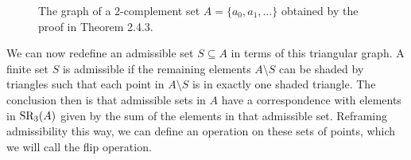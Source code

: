 \documentclass{article}
\theoremstyle{definition}
\newcommand{\SR}{\textnormal{SR}}
\newcommand{\OrigTop}[4]{
    \tkzDefShiftPoint[#1](120:#2){\fpeval{#1 * 2 + 3}}
    \tkzDefShiftPoint[#1](60:#2){\fpeval{#1 * 2 + 4}}
    \IfEqCase{#3}{
    {fill}{
    \tkzDrawPolygon[fill = gray!20](#1,\fpeval{#1 * 2 + 3},\fpeval{#1 * 2 + 4})
    }
    {nofill}{\tkzDrawPolygon(#1,\fpeval{#1 * 2 + 3},\fpeval{#1 * 2 + 4})}
    }
    \tkzDrawPoints(\fpeval{#1 * 2 + 3},\fpeval{#1 * 2 + 4})
    \IfEqCase{#4}{
    {end}{
    \tkzLabelPoint[above left](\fpeval{#1 * 2 + 3}){$\ddots$}
    \tkzLabelPoint[above right](\fpeval{#1 * 2 + 4}){$\iddots$}
    }
    {mid}{}
    }
}
\newcommand{\OrigRight}[4]{
    \tkzDefShiftPoint[#1](0:#2){\fpeval{#1 * 2 + 3}}
    \tkzDefShiftPoint[#1](-60:#2){\fpeval{#1 * 2 + 4}}
    \IfEqCase{#3}{
    {fill}{
    \tkzDrawPolygon[fill = gray!20](#1,\fpeval{#1 * 2 + 3},\fpeval{#1 * 2 + 4})
    }
    {nofill}{\tkzDrawPolygon(#1,\fpeval{#1 * 2 + 3},\fpeval{#1 * 2 + 4})}
    }
    \tkzDrawPoints(\fpeval{#1 * 2 + 3},\fpeval{#1 * 2 + 4})
    \IfEqCase{#4}{
    {end}{
    \tkzLabelPoint[above right](\fpeval{#1 * 2 + 3}){$\iddots$}
    \tkzLabelPoint[below](\fpeval{#1 * 2 + 4}){$\vdots$}
    }
    {mid}{}
    }
}
\newcommand{\OrigLeft}[4]{
    \tkzDefShiftPoint[#1](180:#2){\fpeval{#1 * 2 + 3}}
    \tkzDefShiftPoint[#1](240:#2){\fpeval{#1 * 2 + 4}}
    \IfEqCase{#3}{
    {fill}{
    \tkzDrawPolygon[fill = gray!20](#1,\fpeval{#1 * 2 + 3},\fpeval{#1 * 2 + 4})
    }
    {nofill}{\tkzDrawPolygon(#1,\fpeval{#1 * 2 + 3},\fpeval{#1 * 2 + 4})}
    }
    \tkzDrawPoints(\fpeval{#1 * 2 + 3},\fpeval{#1 * 2 + 4})
    \IfEqCase{#4}{
    {end}{
    \tkzLabelPoint[above left](\fpeval{#1 * 2 + 3}){$\ddots$}
    \tkzLabelPoint[below](\fpeval{#1 * 2 + 4}){$\vdots$}
    }
    {mid}{}
    }
}
\newcommand{\FlipBottom}[3]{
    \tkzDefShiftPoint[#1](-60:#2){\fpeval{#1 * 2 + 3}}
    \tkzDefShiftPoint[#1](-120:#2){\fpeval{#1 * 2 + 4}}
    \IfEqCase{#3}{
    {fill}{
    \tkzDrawPolygon[fill = gray!20](#1,\fpeval{#1 * 2 + 3},\fpeval{#1 * 2 + 4})
    }
    {nofill}{\tkzDrawPolygon(#1,\fpeval{#1 * 2 + 3},\fpeval{#1 * 2 + 4})}
    }
    \tkzDrawPoints(\fpeval{#1 * 2 + 3},\fpeval{#1 * 2 + 4})
}
\newcommand{\FlipLeft}[3]{
    \tkzDefShiftPoint[#1](-180:#2){\fpeval{#1 * 2 + 3}}
    \tkzDefShiftPoint[#1](120:#2){\fpeval{#1 * 2 + 4}}
    \IfEqCase{#3}{
    {fill}{
    \tkzDrawPolygon[fill = gray!20](#1,\fpeval{#1 * 2 + 3},\fpeval{#1 * 2 + 4})
    }
    {nofill}{\tkzDrawPolygon(#1,\fpeval{#1 * 2 + 3},\fpeval{#1 * 2 + 4})}
    }
    \tkzDrawPoints(\fpeval{#1 * 2 + 3},\fpeval{#1 * 2 + 4})
}
\newcommand{\FlipRight}[3]{
    \tkzDefShiftPoint[#1](0:#2){\fpeval{#1 * 2 + 3}}
    \tkzDefShiftPoint[#1](60:#2){\fpeval{#1 * 2 + 4}}
    \IfEqCase{#3}{
    {fill}{
    \tkzDrawPolygon[fill = gray!20](#1,\fpeval{#1 * 2 + 3},\fpeval{#1 * 2 + 4})
    }
    {nofill}{\tkzDrawPolygon(#1,\fpeval{#1 * 2 + 3},\fpeval{#1 * 2 + 4})}
    }
    \tkzDrawPoints(\fpeval{#1 * 2 + 3},\fpeval{#1 * 2 + 4})
}
\newcommand{\OrigRightNoDots}[4]{
    \tkzDefShiftPoint[#1](0:#2){\fpeval{#1 * 2 + 3}}
    \tkzDefShiftPoint[#1](-60:#2){\fpeval{#1 * 2 + 4}}
    \IfEqCase{#3}{
    {fill}{
    \tkzDrawPolygon[fill = gray!20](#1,\fpeval{#1 * 2 + 3},\fpeval{#1 * 2 + 4})
    }
    {nofill}{\tkzDrawPolygon(#1,\fpeval{#1 * 2 + 3},\fpeval{#1 * 2 + 4})}
    }
    \tkzDrawPoints(\fpeval{#1 * 2 + 3},\fpeval{#1 * 2 + 4})
    \IfEqCase{#4}{
    {end}{
    \tkzLabelPoint[below](\fpeval{#1 * 2 + 4}){$\vdots$}
    }
    {mid}{}
    }
}
\begin{document}
\begin{figure}[H]
\begin{center}
\caption{The graph of a 2-complement set $A = \{a_0,a_1,\dots\}$ obtained by the proof in Theorem 2.4.3.}
\end{center}
\end{figure}
We can now redefine an admissible set $S \subseteq A$ in terms of this triangular graph. A finite set $S$ is admissible if the remaining elements $A \setminus S$ can be shaded by triangles such that each point in $A \setminus S$ is in exactly one shaded triangle. The conclusion then is that admissible sets in $A$ have a correspondence with elements in $\SR_3(A)$ given by the sum of the elements in that admissible set. Reframing admissibility this way, we can define an operation on these sets of points, which we will call the flip operation.
\end{document}
